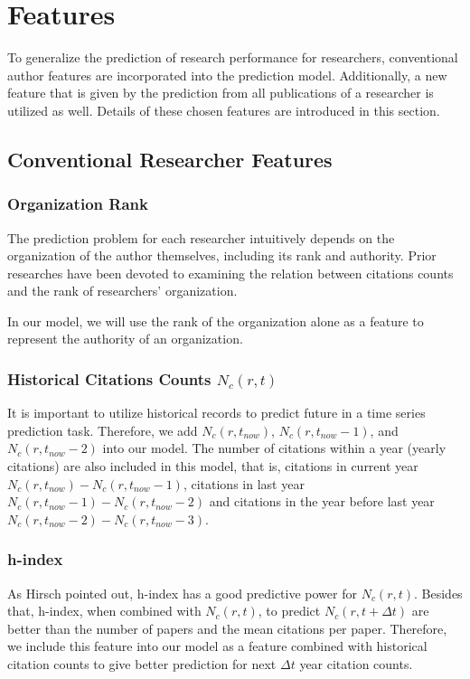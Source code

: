 \section{Features}
To generalize the prediction of research performance for researchers, conventional author features are incorporated into the prediction model.
Additionally, a new feature that is given by the prediction from all publications of a researcher is utilized as well.
Details of these chosen features are introduced in this section.

\subsection{Conventional Researcher Features}
\subsubsection{Organization Rank}
The prediction problem for each researcher intuitively depends on the organization of the author themselves, including its rank and authority.
Prior researches have been devoted to examining the relation between citations counts and the rank of researchers' organization\cite{van2005fatal}.

In our model, we will use the rank of the organization alone as a feature to represent the authority of an organization.

\subsubsection{Historical Citations Counts $N_c(r,t)$}
It is important to utilize historical records to predict future in a time series prediction task\cite{weigend1994time}.
Therefore, we add $N_c(r,t_{now})$, $N_c(r,t_{now}-1)$, and $N_c(r,t_{now}-2)$ into our model.
The number of citations within a year (yearly citations) are also included in this model, that is,
citations in current year
$N_c(r,t_{now})-N_c(r,t_{now}-1)$, citations in last year $N_c(r,t_{now}-1)-N_c(r,t_{now}-2)$ and citations in the year before last year $N_c(r,t_{now}-2)-N_c(r,t_{now}-3)$.

\subsubsection{h-index}
As Hirsch pointed out\cite{hirsch2007does}, h-index has a good predictive power for $N_c(r,t)$.
Besides that, h-index, when combined with $N_c(r,t)$, to predict $N_c(r,t+\Delta t)$ are better than the number of papers and the mean citations per paper.
Therefore, we include this feature into our model as a feature combined with historical citation counts to give better prediction for next $\Delta t$ year citation counts.

